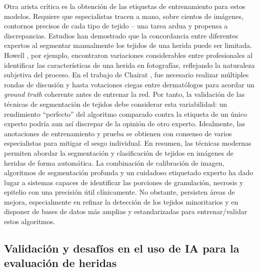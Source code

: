 Otra arista crítica es la obtención de las etiquetas de entrenamiento para estos modelos. Requiere que especialistas tracen a mano, sobre cientos de imágenes, contornos precisos de cada tipo de tejido – una tarea ardua y propensa a discrepancias. Estudios han demostrado que la concordancia entre diferentes expertos al segmentar manualmente los tejidos de una herida puede ser limitada. Howell , por ejemplo, encontraron variaciones considerables entre profesionales al identificar las características de una herida en fotografías, reflejando la naturaleza subjetiva del proceso. En el trabajo de Chairat , fue necesario realizar múltiples rondas de discusión y hasta votaciones ciegas entre dermatólogos para acordar un \textit{ground truth} coherente antes de entrenar la red. Por tanto, la validación de las técnicas de segmentación de tejidos debe considerar esta variabilidad: un rendimiento “perfecto” del algoritmo comparado contra la etiqueta de un único experto podría aun así discrepar de la opinión de otro experto. Idealmente, las anotaciones de entrenamiento y prueba se obtienen con consenso de varios especialistas para mitigar el sesgo individual. En resumen, las técnicas modernas permiten abordar la segmentación y clasificación de tejidos en imágenes de heridas de forma automática. La combinación de calibración de imagen, algoritmos de segmentación profunda y un cuidadoso etiquetado experto ha dado lugar a sistemas capaces de identificar las porciones de granulación, necrosis y epitelio con una precisión útil clínicamente. No obstante, persisten áreas de mejora, especialmente en refinar la detección de los tejidos minoritarios y en disponer de bases de datos más amplias y estandarizadas para entrenar/validar estos algoritmos.


\subsection{Validación y desafíos en el uso de IA para la evaluación de heridas}

